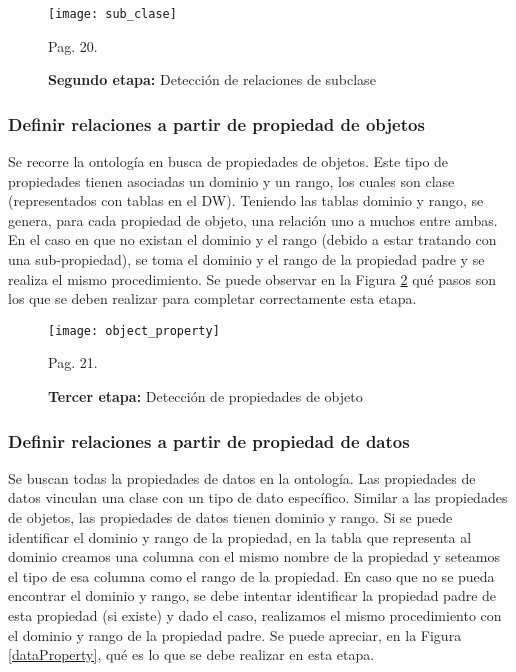 \documentclass[a4paper,11pt]{article}
\begin{document}
    \begin{figure}[!htb]
      \begin{center}
        \texttt{[image: sub\_clase]}
        \caption{\textbf{Segundo etapa:} Detección de relaciones de subclase} \cite{ontologias} Pag. 20.
        \label{subClase}
      \end{center}
    \end{figure}
     
     
    \subsubsection{Definir relaciones a partir de propiedad de objetos}
    
    Se recorre la ontología en busca de propiedades de objetos. Este tipo de propiedades tienen asociadas un dominio y un rango, los cuales son clase
    (representados con tablas en el DW). Teniendo las tablas dominio y rango, se genera, para cada propiedad de objeto, una relación uno a muchos entre ambas. En
    el caso en que no existan el dominio y el rango (debido a estar tratando con una sub-propiedad), se toma el dominio y el rango de la propiedad padre y se
    realiza el mismo procedimiento. Se puede observar en la Figura \ref{objectProperty} qué pasos son los que se deben realizar para completar correctamente esta
    etapa.
    
    \begin{figure}[!htb]
      \begin{center}
        \texttt{[image: object\_property]}
        \caption{\textbf{Tercer etapa:} Detección de propiedades de objeto} \cite{ontologias} Pag. 21.
        \label{objectProperty}
      \end{center}
    \end{figure}
    
    
    \subsubsection{Definir relaciones a partir de propiedad de datos}
    
    Se buscan todas la propiedades de datos en la ontología. Las propiedades de datos vinculan una clase con un tipo de dato específico. Similar a las propiedades
    de objetos, las propiedades de datos tienen dominio y rango. Si se puede identificar el dominio y rango de la propiedad, en la tabla que representa al dominio
    creamos una columna con el mismo nombre de la propiedad y seteamos el tipo de esa columna como el rango de la propiedad. En caso que no se pueda encontrar el
    dominio y rango, se debe intentar identificar la propiedad padre de esta propiedad (si existe) y dado el caso, realizamos el mismo procedimiento con el
    dominio y rango de la propiedad padre. Se puede apreciar, en la Figura \ref{dataProperty}, qué es lo que se debe realizar en esta etapa.
    
\end{document}

